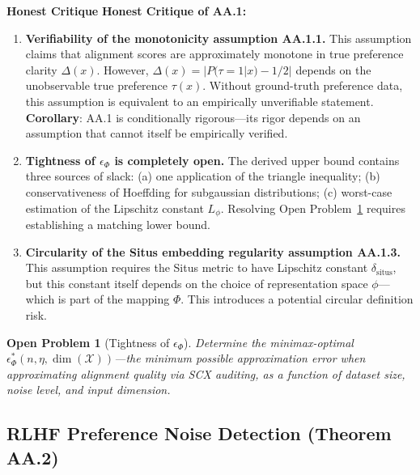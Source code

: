 \documentclass[12pt,a4paper]{article}
\newtheorem{openproblem}[theorem]{Open Problem}
\newcommand{\critique}{\medskip\noindent\textbf{Honest Critique}\quad}
\newcommand{\cX}{\mathcal{X}}
\begin{document}
\critique
\textbf{Honest Critique of AA.1:}
\begin{enumerate}
    \item \textbf{Verifiability of the monotonicity assumption AA.1.1.}
    This assumption claims that alignment scores are approximately monotone in true preference clarity $\Delta(x)$. However, $\Delta(x) = |P(\tau=1|x) - 1/2|$ depends on the unobservable true preference $\tau(x)$. Without ground-truth preference data, this assumption is equivalent to an empirically unverifiable statement. \textbf{Corollary}: AA.1 is conditionally rigorous---its rigor depends on an assumption that cannot itself be empirically verified.
    \item \textbf{Tightness of $\epsilon_\Phi$ is completely open.}
    The derived upper bound contains three sources of slack: (a) one application of the triangle inequality; (b) conservativeness of Hoeffding for subgaussian distributions; (c) worst-case estimation of the Lipschitz constant $L_\phi$. Resolving Open Problem~\ref{prob:epsilon-phi} requires establishing a matching lower bound.
    \item \textbf{Circularity of the Situs embedding regularity assumption AA.1.3.}
    This assumption requires the Situs metric to have Lipschitz constant $\delta_{\mathrm{situs}}$, but this constant itself depends on the choice of representation space $\phi$---which is part of the mapping $\Phi$. This introduces a potential circular definition risk.
\end{enumerate}

\begin{openproblem}[Tightness of $\epsilon_\Phi$]
\label{prob:epsilon-phi}
Determine the minimax-optimal $\epsilon_\Phi^*(n,\eta,\dim(\cX))$---the minimum possible approximation error when approximating alignment quality via \textsf{SCX} auditing, as a function of dataset size, noise level, and input dimension.
\end{openproblem}

\subsection{RLHF Preference Noise Detection (Theorem AA.2)}
\end{document}
